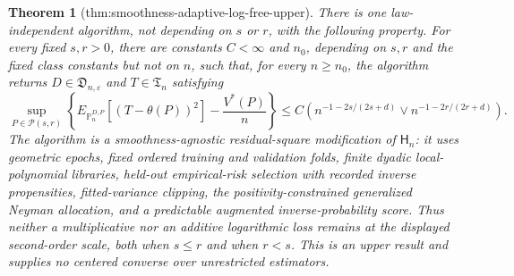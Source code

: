 \documentclass{article}
\newtheorem{theorem}{Theorem}
\begin{document}
\begin{theorem}[thm:smoothness-adaptive-log-free-upper]\label{thm:smoothness-adaptive-log-free-upper}
There is one law-independent algorithm, not depending on \(s\) or \(r\), with the following property.  For every fixed \(s,r>0\), there are constants \(C<\infty\) and \(n_0\), depending on \(s,r\) and the fixed class constants but not on \(n\), such that, for every \(n\geq n_0\), the algorithm returns \(D\in\mathfrak D_{n,\varepsilon}\) and \(T\in\mathfrak T_n\) satisfying
\[
\sup_{P\in\mathcal P(s,r)}
\left\{
E_{\mathbb P_n^{D,P}}[(T-\theta(P))^2]-\frac{V^*(P)}n
\right\}
\leq C\left(
n^{-1-2s/(2s+d)}\vee n^{-1-2r/(2r+d)}
\right).
\]
The algorithm is a smoothness-agnostic residual-square modification of \(\mathsf H_n\): it uses geometric epochs, fixed ordered training and validation folds, finite dyadic local-polynomial libraries, held-out empirical-risk selection with recorded inverse propensities, fitted-variance clipping, the positivity-constrained generalized Neyman allocation, and a predictable augmented inverse-probability score.  Thus neither a multiplicative nor an additive logarithmic loss remains at the displayed second-order scale, both when \(s\leq r\) and when \(r<s\).  This is an upper result and supplies no centered converse over unrestricted estimators.
\end{theorem}
\end{document}
